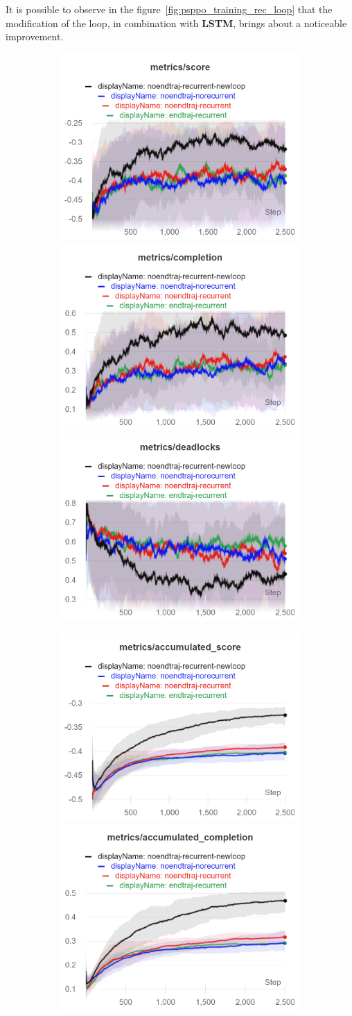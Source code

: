 \documentclass[11pt, a4paper, hidelinks]{report}
\begin{document}
It is possible to observe in the figure~\ref{fig:psppo_training_rec_loop} that the modification of the loop, in combination with \textbf{LSTM}, brings about a noticeable improvement.
\begin{figure}
	\begin{subfigure}{\linewidth}
		\includegraphics[width=0.33\linewidth]{resources/charts_psppo_2/score}\hfill
		\includegraphics[width=0.33\linewidth]{resources/charts_psppo_2/completion}\hfill
		\includegraphics[width=0.33\linewidth]{resources/charts_psppo_2/deadlocks}
	\end{subfigure}\par\medskip
	\begin{subfigure}{\linewidth}
		\includegraphics[width=0.33\linewidth]{resources/charts_psppo_2/accumulated_score}\hfill
		\includegraphics[width=0.33\linewidth]{resources/charts_psppo_2/accumulated_completion}\hfill

\end{subfigure}
\end{figure}
\end{document}
